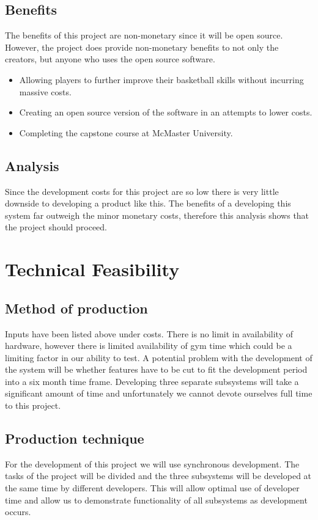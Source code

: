 \subsection{Benefits}
The benefits of this project are non-monetary since it will be open source. However, the project does provide non-monetary benefits to not only the creators, but anyone who uses the open source software.\\
\begin{itemize}
    \item Allowing players to further improve their basketball skills without incurring massive costs.
    \item Creating an open source version of the software in an attempts to lower costs.
    \item Completing the capstone course at McMaster University.
\end{itemize}

\subsection{Analysis}
Since the development costs for this project are so low there is very little downside to developing a product like this. The benefits of a developing this system far outweigh the minor monetary costs, therefore this analysis shows that the project should proceed.

\section{Technical Feasibility}
\subsection{Method of production}
\hspace*{4mm}Inputs have been listed above under costs. There is no limit in availability of hardware, however there is limited availability of gym time which could be a limiting factor in our ability to test. A potential problem with the development of the system will be whether features have to be cut to fit the development period into a six month time frame. Developing three separate subsystems will take a significant amount of time and unfortunately we cannot devote ourselves full time to this project.

\subsection{Production technique}
For the development of this project we will use synchronous development. The tasks of the project will be divided and the three subsystems will be developed at the same time by different developers. This will allow optimal use of developer time and allow us to demonstrate functionality of all subsystems as development occurs.

